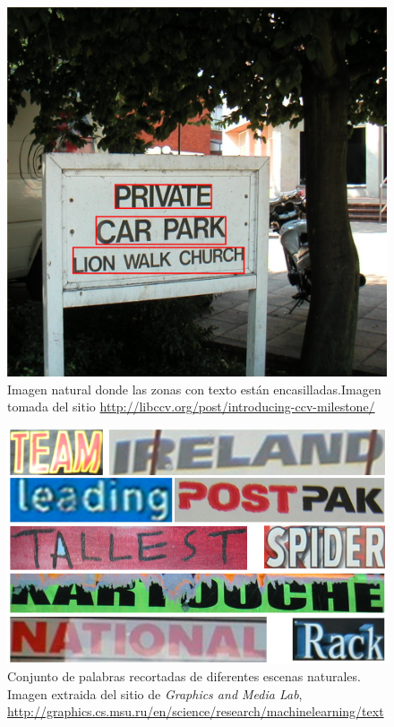 	\begin{figure}[htbp]
		\centering
		\centerline{ \includegraphics[scale=0.25]{img/zone_with_text.png} }
		\caption[Detección de zonas con texto]{Imagen natural donde las zonas con texto están encasilladas.Imagen tomada del sitio \url{http://libccv.org/post/introducing-ccv-milestone/} }
		\label{fig: Zona texto}
	\end{figure}
	
	\begin{figure}[htbp]
		\centering
		\centerline{ \includegraphics[scale=0.5]{img/cropped_words.png} }
		\caption[Reconocimiento de palabras recortadas]{Conjunto de palabras recortadas de diferentes escenas naturales. Imagen extraida del sitio de \textit{Graphics and Media Lab}, \url{http://graphics.cs.msu.ru/en/science/research/machinelearning/text}}
		\label{fig: Reconocimiento palabras}
	\end{figure}

